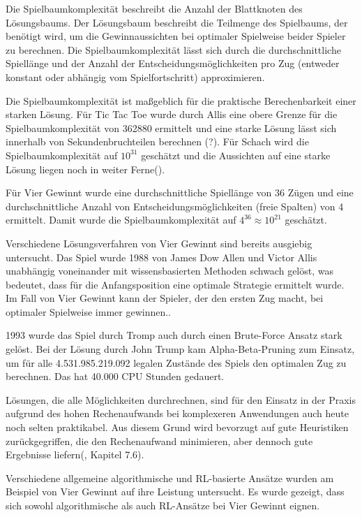 Die Spielbaumkomplexität beschreibt die Anzahl der Blattknoten des Lösungsbaums. Der Lösungsbaum beschreibt die Teilmenge des Spielbaums, der benötigt wird, um die Gewinnaussichten bei optimaler Spielweise beider Spieler zu berechnen. Die Spielbaumkomplexität lässt sich durch die durchschnittliche Spiellänge und der Anzahl der Entscheidungsmöglichkeiten pro Zug (entweder konstant oder abhängig vom Spielfortschritt) approximieren.

Die Spielbaumkomplexität ist maßgeblich für die praktische Berechenbarkeit einer starken Lösung. Für Tic Tac Toe wurde durch Allis eine obere Grenze für die Spielbaumkomplexität von 362880 ermittelt und eine starke Lösung lässt sich innerhalb von Sekundenbruchteilen berechnen (?). Für Schach wird die Spielbaumkomplexität auf $10^{31}$ geschätzt und die Aussichten auf eine starke Lösung liegen noch in weiter Ferne(\cite{Schaeffer.2007}).


Für Vier Gewinnt wurde eine durchschnittliche Spiellänge von 36 Zügen und eine durchschnittliche Anzahl von Entscheidungsmöglichkeiten (freie Spalten) von 4 ermittelt. Damit wurde die Spielbaumkomplexität auf $4^{36} \approx 10^{21}$ geschätzt.

Verschiedene Lösungsverfahren von Vier Gewinnt sind bereits ausgiebig untersucht. Das Spiel wurde 1988 von James Dow Allen und Victor Allis unabhängig voneinander mit wissensbasierten Methoden schwach gelöst, was bedeutet, dass für die Anfangsposition eine optimale Strategie ermittelt wurde. Im Fall von Vier Gewinnt kann der Spieler, der den ersten Zug macht, bei optimaler Spielweise immer gewinnen.\cite{Allen.2010}\cite{Allis.1988}.

1993 wurde das Spiel durch Tromp auch durch einen Brute-Force Ansatz stark gelöst. Bei der Lösung durch John Trump kam Alpha-Beta-Pruning zum Einsatz, um für alle 4.531.985.219.092 legalen Zustände des Spiels den optimalen Zug zu berechnen\cite{Tromp}. Das hat 40.000 CPU Stunden gedauert. 


Lösungen, die alle Möglichkeiten durchrechnen, sind für den Einsatz in der Praxis aufgrund des hohen Rechenaufwands bei komplexeren Anwendungen auch heute noch selten praktikabel. Aus diesem Grund wird bevorzugt auf gute Heuristiken zurückgegriffen, die den Rechenaufwand minimieren, aber dennoch gute Ergebnisse liefern(\cite{Heineman.October2008}, Kapitel 7.6).


Verschiedene allgemeine algorithmische und RL-basierte Ansätze wurden am Beispiel von Vier Gewinnt auf ihre Leistung untersucht. Es wurde gezeigt, dass sich sowohl algorithmische als auch RL-Ansätze bei Vier Gewinnt eignen\cite{Alderton.2019}\cite{Thill.2012}\cite{Wäldchen.2022}\cite{Taylor.2024}\cite{Sheoran.2022}\cite{Qiu.2022}.
